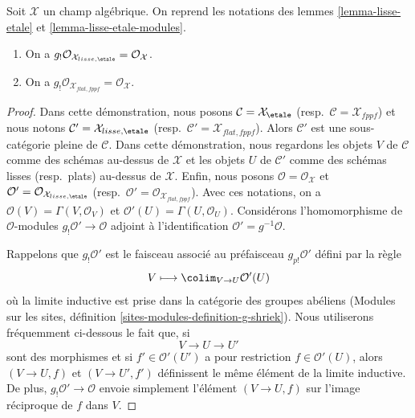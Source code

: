 \begin{lemma}
\label{lemma-lisse-etale-structure-sheaf}
Soit $\mathcal{X}$ un champ algébrique. On reprend les notations des
lemmes \ref{lemma-lisse-etale} et \ref{lemma-lisse-etale-modules}.
\begin{enumerate}
\item On a $g_!\mathcal{O}_{\mathcal{X}_{lisse,\etale}} =
\mathcal{O}_\mathcal{X}$.
\item On a $g_!\mathcal{O}_{\mathcal{X}_{flat, fppf}} =
\mathcal{O}_\mathcal{X}$.
\end{enumerate}
\end{lemma}

\begin{proof}
Dans cette démonstration, nous posons
$\mathcal{C} = \mathcal{X}_\etale$
(resp.\ $\mathcal{C} = \mathcal{X}_{fppf}$)
et nous notons
$\mathcal{C}' = \mathcal{X}_{lisse,\etale}$
(resp.\ $\mathcal{C}' = \mathcal{X}_{flat, fppf}$).
Alors $\mathcal{C}'$ est une sous-catégorie pleine de $\mathcal{C}$.
Dans cette démonstration, nous regardons les objets $V$ de $\mathcal{C}$
comme des schémas au-dessus de $\mathcal{X}$ et les objets $U$ de $\mathcal{C}'$
comme des schémas lisses (resp.\ plats) au-dessus de $\mathcal{X}$.
Enfin, nous posons $\mathcal{O} = \mathcal{O}_\mathcal{X}$
et $\mathcal{O}' = \mathcal{O}_{\mathcal{X}_{lisse,\etale}}$
(resp.\ $\mathcal{O}' = \mathcal{O}_{\mathcal{X}_{flat,fppf}}$).
Avec ces notations, on a $\mathcal{O}(V) = \Gamma(V, \mathcal{O}_V)$
et $\mathcal{O}'(U) = \Gamma(U, \mathcal{O}_U)$.
Considérons l'homomorphisme de $\mathcal{O}$-modules
$g_!\mathcal{O}' \to \mathcal{O}$
adjoint à l'identification $\mathcal{O}' = g^{-1}\mathcal{O}$.

\medskip\noindent
Rappelons que $g_!\mathcal{O}'$ est le faisceau associé au préfaisceau
$g_{p!}\mathcal{O}'$ défini par la règle
$$
V \longmapsto \colim_{V \to U} \mathcal{O}'(U)
$$
où la limite inductive est prise dans la catégorie des groupes abéliens
(Modules sur les sites, définition \ref{sites-modules-definition-g-shriek}).
Nous utiliserons fréquemment ci-dessous le fait que, si
$$
V \to U \to U'
$$
sont des morphismes et si $f' \in \mathcal{O}'(U')$ a pour restriction
$f \in \mathcal{O}'(U)$, alors $(V \to U, f)$ et $(V \to U', f')$
définissent le même élément de la limite inductive. De plus,
$g_!\mathcal{O}' \to \mathcal{O}$ envoie simplement l'élément
$(V \to U, f)$ sur l'image réciproque de $f$ dans $V$.


\end{proof}
